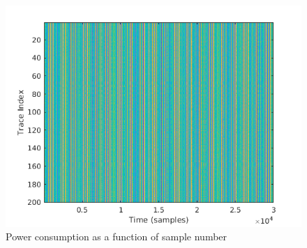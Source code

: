 \begin{figure}[!ht]
    \centering
    \includegraphics[width=1.0\textwidth]{images/chapter8/DataSet.png}
    \caption{Power consumption as a function of sample number} \label{fig:c8_Matlab_power_as_sample_number}
\end{figure}

